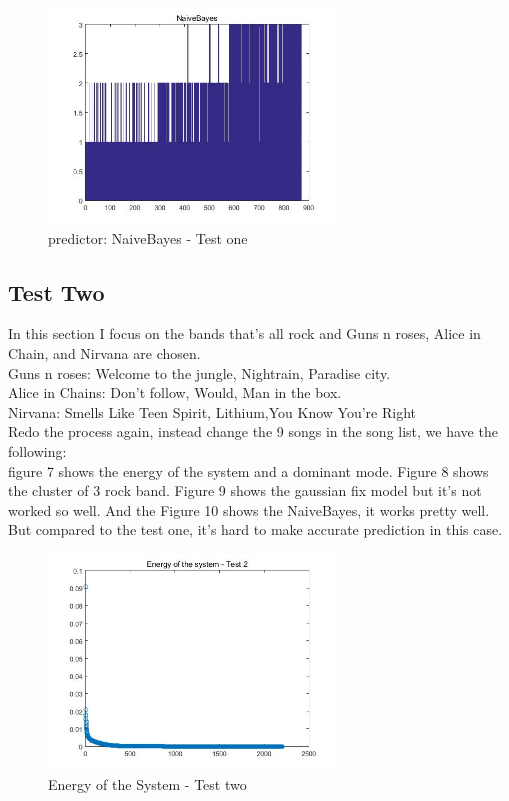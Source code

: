 \documentclass[12pt,letterpaper]{article}
\begin{document}
\begin{figure}[h]
	\centering
	\includegraphics[width=3.0in]{p4}
	\caption{predictor: NaiveBayes - Test one}
	
\end{figure}

\subsection{Test Two}
In this section I focus on the bands that's all rock and Guns n roses, Alice in Chain, and Nirvana are chosen. \\
Guns n roses: Welcome to the jungle, Nightrain, Paradise city.\\
Alice in Chains: Don't follow, Would, Man in the box.\\
Nirvana: Smells Like Teen Spirit, Lithium,You Know You're Right\\
Redo the process again, instead change the 9 songs in the song list, we have the following:\\
figure 7 shows the energy of the system and a dominant mode. Figure 8 shows the cluster of 3 rock band. Figure 9 shows the gaussian fix model but it's not worked so well. And the Figure 10 shows the NaiveBayes, it works pretty well. But compared to the test one, it's hard to make accurate prediction in this case.
\begin{figure}[h]
	\centering
	\includegraphics[width=3.0in]{p6}
	\caption{Energy of the System - Test two}
\end{figure}
\end{document}
